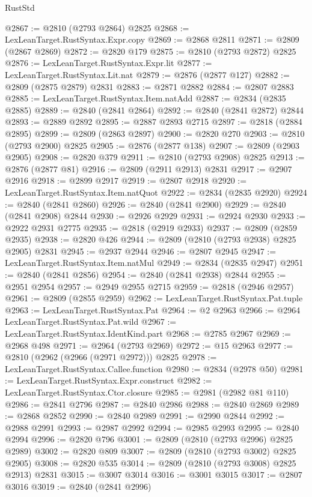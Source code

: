 \begin{lexlean}{RustStd}
\begin{coremodule}
@2867 := @2810 (@2793 @2864) @2825
@2868 := LexLeanTarget.RustSyntax.Expr.copy
@2869 := @2868 @2811
@2871 := @2809 (@2867 @2869)
@2872 := @2820 @179
@2875 := @2810 (@2793 @2872) @2825
@2876 := LexLeanTarget.RustSyntax.Expr.lit
@2877 := LexLeanTarget.RustSyntax.Lit.nat
@2879 := @2876 (@2877 @127)
@2882 := @2809 (@2875 @2879) @2831
@2883 := @2871 @2882
@2884 := @2807 @2883
@2885 := LexLeanTarget.RustSyntax.Item.natAdd
@2887 := @2834 (@2835 @2885)
@2889 := @2840 (@2841 @2864)
@2892 := @2840 (@2841 @2872) @2844
@2893 := @2889 @2892
@2895 := @2887 @2893 @2715
@2897 := @2818 (@2884 @2895)
@2899 := @2809 (@2863 @2897)
@2900 := @2820 @270
@2903 := @2810 (@2793 @2900) @2825
@2905 := @2876 (@2877 @138)
@2907 := @2809 (@2903 @2905)
@2908 := @2820 @379
@2911 := @2810 (@2793 @2908) @2825
@2913 := @2876 (@2877 @81)
@2916 := @2809 (@2911 @2913) @2831
@2917 := @2907 @2916
@2918 := @2899 @2917
@2919 := @2807 @2918
@2920 := LexLeanTarget.RustSyntax.Item.natQuot
@2922 := @2834 (@2835 @2920)
@2924 := @2840 (@2841 @2860)
@2926 := @2840 (@2841 @2900)
@2929 := @2840 (@2841 @2908) @2844
@2930 := @2926 @2929
@2931 := @2924 @2930
@2933 := @2922 @2931 @2775
@2935 := @2818 (@2919 @2933)
@2937 := @2809 (@2859 @2935)
@2938 := @2820 @426
@2944 := @2809 (@2810 (@2793 @2938) @2825 @2905) @2831
@2945 := @2937 @2944
@2946 := @2807 @2945
@2947 := LexLeanTarget.RustSyntax.Item.natMul
@2949 := @2834 (@2835 @2947)
@2951 := @2840 (@2841 @2856)
@2954 := @2840 (@2841 @2938) @2844
@2955 := @2951 @2954
@2957 := @2949 @2955 @2715
@2959 := @2818 (@2946 @2957)
@2961 := @2809 (@2855 @2959)
@2962 := LexLeanTarget.RustSyntax.Pat.tuple
@2963 := LexLeanTarget.RustSyntax.Pat
@2964 := @2 @2963
@2966 := @2964 LexLeanTarget.RustSyntax.Pat.wild
@2967 := LexLeanTarget.RustSyntax.IdentKind.part
@2968 := @2785 @2967
@2969 := @2968 @498
@2971 := @2964 (@2793 @2969)
@2972 := @15 @2963
@2977 := @2810 (@2962 (@2966 (@2971 @2972))) @2825
@2978 := LexLeanTarget.RustSyntax.Callee.function
@2980 := @2834 (@2978 @50)
@2981 := LexLeanTarget.RustSyntax.Expr.construct
@2982 := LexLeanTarget.RustSyntax.Ctor.closure
@2985 := @2981 (@2982 @81 @110)
@2986 := @2841 @2796
@2987 := @2840 @2986
@2988 := @2840 @2869
@2989 := @2868 @2852
@2990 := @2840 @2989
@2991 := @2990 @2844
@2992 := @2988 @2991
@2993 := @2987 @2992
@2994 := @2985 @2993
@2995 := @2840 @2994
@2996 := @2820 @796
@3001 := @2809 (@2810 (@2793 @2996) @2825 @2989)
@3002 := @2820 @809
@3007 := @2809 (@2810 (@2793 @3002) @2825 @2905)
@3008 := @2820 @535
@3014 := @2809 (@2810 (@2793 @3008) @2825 @2913) @2831
@3015 := @3007 @3014
@3016 := @3001 @3015
@3017 := @2807 @3016
@3019 := @2840 (@2841 @2996)

\end{coremodule}
\end{lexlean}
